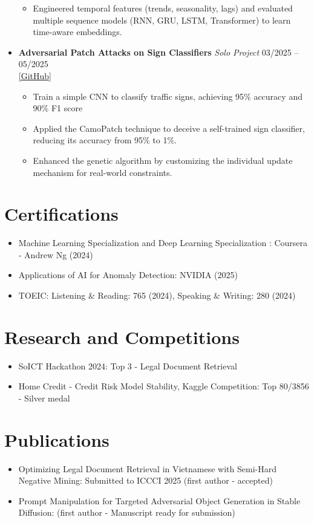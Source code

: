 \documentclass{article}
\begin{document}
\begin{itemize}
\begin{itemize}
        \item Engineered temporal features (trends, seasonality, lags) and evaluated multiple sequence models (RNN, GRU, LSTM, Transformer) to learn time-aware embeddings.
    \end{itemize}
    \item \textbf{Adversarial Patch Attacks on Sign Classifiers} \hfill \textit{Solo Project} \hfill 03/2025 -- 05/2025 \\
    \href{https://github.com/hoanglvuit/Blackbox-Attack-on-Realworld}{[GitHub]}
    \begin{itemize}
        \item Train a simple CNN to classify traffic signs, achieving 95\% accuracy and 90\% F1 score
        \item Applied the CamoPatch technique to deceive a self-trained sign classifier, reducing its accuracy from 95\% to 1\%.
        \item Enhanced the genetic algorithm by customizing the individual update mechanism for real-world constraints.
    \end{itemize}
\end{itemize}

\section*{Certifications}
\begin{itemize}
    \item Machine Learning Specialization and Deep Learning Specialization : Coursera - Andrew Ng (2024)
    \item Applications of AI for Anomaly Detection: NVIDIA (2025)
    \item TOEIC: Listening \& Reading: 765 (2024), Speaking \& Writing: 280 (2024)
\end{itemize}

\section*{Research and Competitions}
\begin{itemize}
    \item SoICT Hackathon 2024: Top 3 - Legal Document Retrieval
    \item Home Credit - Credit Risk Model Stability, Kaggle Competition: Top 80/3856 - Silver medal
\end{itemize}

\section*{Publications}
\begin{itemize}
    \item Optimizing Legal Document Retrieval in Vietnamese with Semi-Hard Negative Mining: Submitted to ICCCI 2025 (first author - accepted)
    \item Prompt Manipulation for Targeted Adversarial Object Generation in Stable Diffusion: (first author - Manuscript ready for submission)
\end{itemize}
\end{document}
